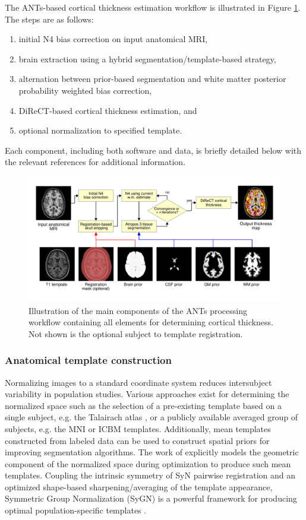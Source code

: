 The ANTs-based cortical thickness estimation workflow is illustrated 
in Figure \ref{fig:pipeline}.  The steps are as follows:
\begin{enumerate}
  \item initial N4 bias correction on input anatomical MRI,
  \item brain extraction using a hybrid segmentation/template-based strategy,
  \item alternation between prior-based segmentation and white matter posterior
        probability weighted bias correction,
  \item DiReCT-based cortical thickness estimation, and
  \item optional normalization to specified template.
\end{enumerate}
Each component, including both software and data, is briefly detailed 
below with the relevant references for additional information. 
\begin{figure}
  \centering
  \includegraphics[width=170mm]{figs/Kapowski_pipeline2.pdf}
  \caption{Illustration of the main components of the ANTs processing 
  workflow containing all elements for determining cortical thickness. 
  Not shown is the optional subject to template registration.}
  \label{fig:pipeline}
\end{figure}

\subsubsection{Anatomical template construction}
Normalizing images to a standard coordinate system
reduces intersubject variability in population studies.  Various
approaches exist for determining the normalized space such as the selection
of a pre-existing template based on a single subject, e.g. the Talairach
atlas \citep{Talairach1988}, or a publicly available averaged group of
subjects, e.g. the MNI \citep{Collins1994} or ICBM \citep{Mazziotta1995}
templates.  Additionally, mean templates constructed from labeled
data can be used to construct spatial priors for improving segmentation
algorithms.
The work of \cite{avants2010} explicitly models the geometric component of the 
normalized space during optimization to produce such mean templates.  Coupling the intrinsic symmetry of 
SyN pairwise registration \citep{Avants2011} and an
optimized shape-based sharpening/averaging of the template appearance, Symmetric Group
Normalization (SyGN) is a powerful framework for producing optimal population-specific
templates \citep{avants2010}.

